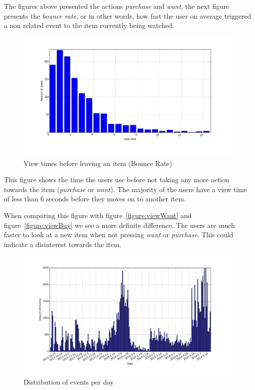 The figures above presented the actions \emph{purchase} and \emph{want}, the
next figure presents the \emph{bounce rate}, or in other words, how fast the
user on average triggered a non related event to the item currently being
watched.

\begin{figure}[H]
  \centering
  \includegraphics[width=5in]{image/product_detail_clickeddistribution.png}
  \caption{View times before leaving an item (Bounce Rate)}
  \label{figure:bounceRate}
\end{figure}

This figure shows the time the users use before not taking any more action
towards the item (\emph{purchase} or \emph{want}).  The majority of the users
have a view time of less than 6 seconds before they moves on to another item.

When comparing this figure with figure~\ref{figure:viewWant} and
figure~\ref{figure:viewBuy} we see a more definite difference.  The users are
much faster to look at a new item when not pressing \emph{want} or
\emph{purchase}.  This could indicate a disinterest towards the item.

\begin{figure}[H]
  \centering
  \includegraphics[width=5in]{image/eventsPerDay.png}
  \caption{Distribution of events per day}
  \label{figure:eventOnDaysDist}
\end{figure}

